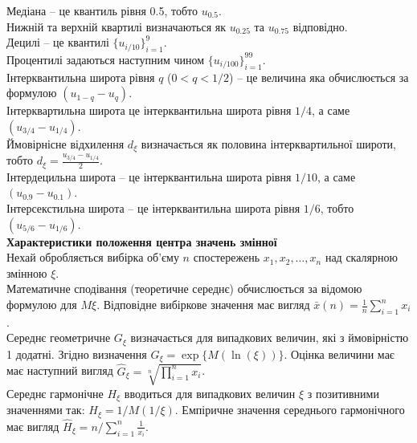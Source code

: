 Медіана -- це квантиль рівня 0.5, тобто $u_{0.5}$. \\

Нижній та верхній квартилі визначаються як $u_{0.25}$ та $u_{0.75}$ відповідно. \\

Децилі -- це квантилі $\{ u_{i/10} \}_{i=1}^9$. \\

Процентилі задаються наступним чином $\{ u_{i/100} \}_{i=1}^{99}$. \\

Інтерквантильна широта рівня $q$ ($0 < q < 1 /2$) -- це величина яка обчислюється за формулою $(u_{1 - q} - u_q)$. \\

Інтерквартильна широта це інтерквантильна широта рівня $1/4$, а саме $(u_{3/4} - u_{1/4})$. \\

Ймовірнісне відхилення $d_\xi$ визначається як половина інтерквартильної широти, тобто $d_\xi = \frac{u_{3/4} - u_{1/4}}{2}$. \\

Інтердецильна широта -- це інтерквантильна широта рівня $1 / 10$, а саме $(u_{0.9} - u_{0.1})$. \\

Інтерсекстильна широта -- це інтерквантильна широта рівня $1 / 6$, тобто $(u_{5/6} - u_{1/6})$. \\

\textbf{Характеристики положення центра значень змінної} \\

Нехай обробляється вибірка об'єму $n$ спостережень $x_1, x_2, \ldots, x_n$ над скалярною змінною $\xi$. \\

Математичне сподівання (теоретичне середнє) обчислюється за відомою формулою для $M \xi$. Відповідне вибіркове значення має вигляд $\bar{x}(n)= \frac{1}{n} \sum_{i=1}^n x_i$. \\

Середнє геометричне $G_\xi$ визначається для випадкових величин, які з ймовірністю 1 додатні. Згідно визначення $G_\xi = \exp\{M (\ln (\xi))\}$. Оцінка величини має має наступний вигляд $\widehat{G}_\xi = \sqrt[n]{\prod_{i=1}^n x_i}$. \\

Середнє гармонічне $H_\xi$ вводиться для випадкових величин $\xi$ з позитивними значеннями так: $H_\xi = 1 / M(1 / \xi)$. Емпіричне значення середнього гармонічного має вигляд $\widehat{H}_\xi = n / \sum_{i=1}^n \frac{1}{x_i}$. \\

